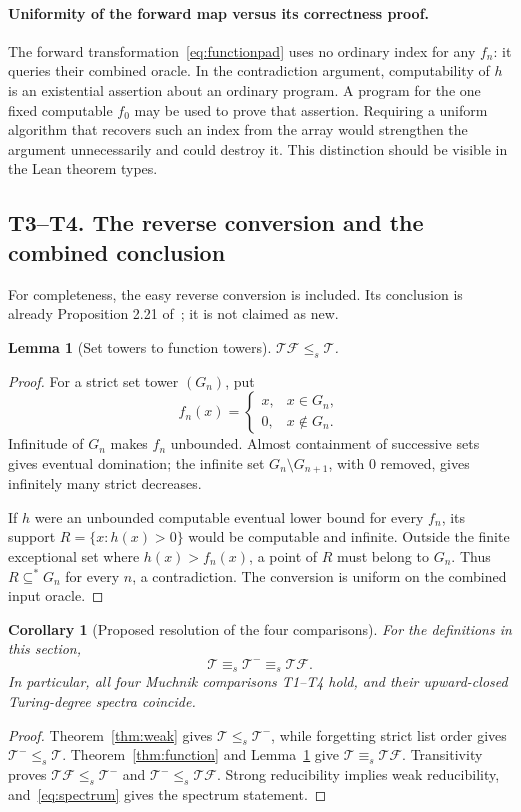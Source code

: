 \documentclass[11pt,a4paper]{article}
\newcommand{\T}{\mathcal T}\newcommand{\TF}{\mathcal{TF}}\newcommand{\Tw}{\mathcal T^{-}}
\newcommand{\substar}{\subseteq^{*}}\newcommand{\lestar}{\leq^{*}}
\newtheorem{lemma}[theorem]{Lemma}
\newtheorem{corollary}[theorem]{Corollary}
\theoremstyle{definition}\newtheorem{definition}[theorem]{Definition}
\theoremstyle{remark}\newtheorem{remark}[theorem]{Remark}
\begin{document}
\paragraph{Uniformity of the forward map versus its correctness proof.}
The forward transformation~\eqref{eq:functionpad} uses no ordinary index for
any $f_n$: it queries their combined oracle. In the contradiction argument,
computability of $h$ is an existential assertion about an ordinary program.
A program for the one fixed computable $f_0$ may be used to prove that
assertion. Requiring a uniform algorithm that recovers such an index from the
array would strengthen the argument unnecessarily and could destroy it.
This distinction should be visible in the Lean theorem types.

\subsection{T3--T4. The reverse conversion and the combined conclusion}\label{entry:T3}\label{entry:T4}
For completeness, the easy reverse conversion is included. Its conclusion is
already Proposition 2.21 of~\cite{McDonald}; it is not claimed as new.

\begin{lemma}[Set towers to function towers]\label{lem:reverse}
$\TF\leq_s\T$.
\end{lemma}
\begin{proof}
For a strict set tower $(G_n)$, put
\[
 f_n(x)=\begin{cases}x,&x\in G_n,\\0,&x\notin G_n.\end{cases}
\]
Infinitude of $G_n$ makes $f_n$ unbounded. Almost containment of successive
sets gives eventual domination; the infinite set $G_n\setminus G_{n+1}$,
with $0$ removed, gives infinitely many strict decreases.

If $h$ were an unbounded computable eventual lower bound for every $f_n$,
its support $R=\{x:h(x)>0\}$ would be computable and infinite. Outside the
finite exceptional set where $h(x)>f_n(x)$, a point of $R$ must belong to
$G_n$. Thus $R\substar G_n$ for every $n$, a contradiction. The conversion
is uniform on the combined input oracle.
\end{proof}

\begin{corollary}[Proposed resolution of the four comparisons]\label{cor:all}
For the definitions in this section,
\begin{equation}
 \boxed{\T\equiv_s\Tw\equiv_s\TF.}
 \label{eq:equivalence}
\end{equation}
In particular, all four Muchnik comparisons T1--T4 hold, and their
upward-closed Turing-degree spectra coincide.
\end{corollary}
\begin{proof}
Theorem~\ref{thm:weak} gives $\T\leq_s\Tw$, while forgetting strict list
order gives $\Tw\leq_s\T$. Theorem~\ref{thm:function} and
Lemma~\ref{lem:reverse} give $\T\equiv_s\TF$. Transitivity proves
$\TF\leq_s\Tw$ and $\Tw\leq_s\TF$. Strong reducibility implies weak
reducibility, and~\eqref{eq:spectrum} gives the spectrum statement.
\end{proof}
\end{document}
